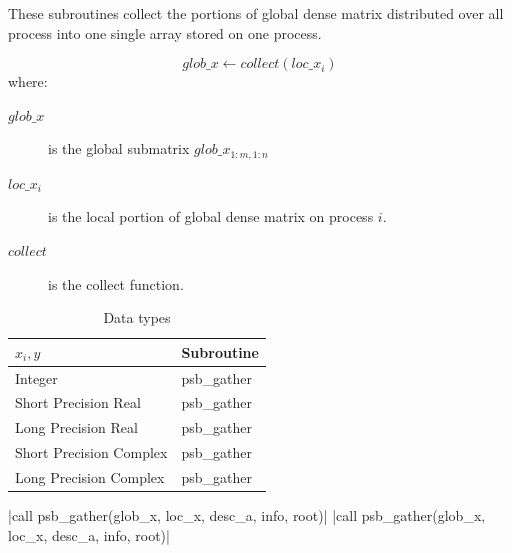 These subroutines collect the portions of global dense matrix
distributed over all process into one single array stored on one
process.

\[ glob\_x \leftarrow collect(loc\_x_i) \]
where:
\begin{description}
\item[$glob\_x$] is the global submatrix $glob\_x_{1:m,1:n}$
\item[$loc\_x_i$] is the local portion of global dense matrix on
process $i$.
\item[$collect$] is the collect function.
\end{description}

\begin{table}[h]
\begin{center}
\begin{tabular}{ll}
\hline
$x_i, y$ & {\bf Subroutine}\\
\hline
Integer            & psb\_gather \\
Short Precision Real & psb\_gather \\
Long Precision Real & psb\_gather \\
Short Precision Complex & psb\_gather \\
Long Precision Complex & psb\_gather \\
\hline
\end{tabular}
\end{center}
\caption{Data types\label{tab:gather}}
\end{table}

\noindent\fortinline|call psb_gather(glob_x, loc_x, desc_a, info, root)|
\fortinline|call psb_gather(glob_x, loc_x, desc_a, info, root)|


